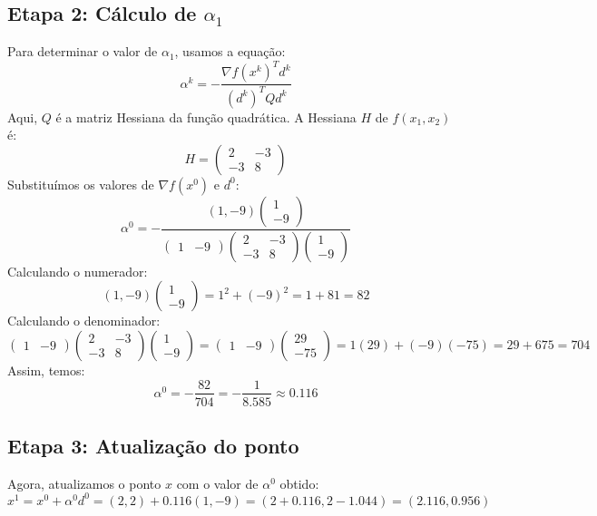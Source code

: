 \documentclass[a4paper, 12pt]{article}
\begin{document}
\subsection{Etapa 2: Cálculo de \( \alpha_1 \)}
Para determinar o valor de \( \alpha_1 \), usamos a equação:
\[
\alpha^k = -\frac{\nabla f(x^k)^T d^k}{(d^k)^T Q d^k}
\]
Aqui, \( Q \) é a matriz Hessiana da função quadrática. A Hessiana \( H \) de \( f(x_1, x_2) \) é:
\[
H = \begin{pmatrix} 2 & -3 \\ -3 & 8 \end{pmatrix}
\]
Substituímos os valores de \( \nabla f(x^0) \) e \( d^0 \):
\[
\alpha^0 = -\frac{(1, -9) \begin{pmatrix} 1 \\ -9 \end{pmatrix}}{\begin{pmatrix} 1 & -9 \end{pmatrix} \begin{pmatrix} 2 & -3 \\ -3 & 8 \end{pmatrix} \begin{pmatrix} 1 \\ -9 \end{pmatrix}}
\]
Calculando o numerador:
\[
(1, -9) \begin{pmatrix} 1 \\ -9 \end{pmatrix} = 1^2 + (-9)^2 = 1 + 81 = 82
\]
Calculando o denominador:
\[
\begin{pmatrix} 1 & -9 \end{pmatrix} \begin{pmatrix} 2 & -3 \\ -3 & 8 \end{pmatrix} \begin{pmatrix} 1 \\ -9 \end{pmatrix} = \begin{pmatrix} 1 & -9 \end{pmatrix} \begin{pmatrix} 29 \\ -75 \end{pmatrix} = 1(29) + (-9)(-75) = 29 + 675 = 704
\]
Assim, temos:
\[
\alpha^0 = -\frac{82}{704} = -\frac{1}{8.585} \approx 0.116
\]

\subsection{Etapa 3: Atualização do ponto}
Agora, atualizamos o ponto \( x \) com o valor de \( \alpha^0 \) obtido:
\[
x^1 = x^0 + \alpha^0 d^0 = (2, 2) + 0.116 (1, -9) = (2 + 0.116, 2 - 1.044) = (2.116, 0.956)
\]
\end{document}
